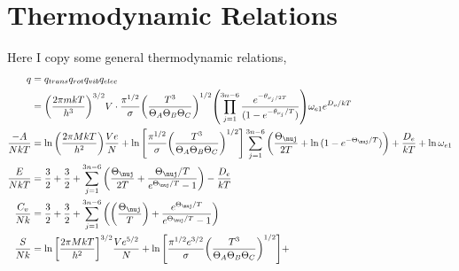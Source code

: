\section{Thermodynamic Relations}%
\label{sec:polytr}
Here I copy some general thermodynamic relations,
\begin{align*}
	q &= q_{trans} q_{rot} q_{vib} q_{elec}\\
	  &= {\left(\frac{2\pi mkT}{h^3}\right)}^{3/2}V \cdot
		 \frac{\pi^{1/2}}{\sigma}
		 {\left(\frac{T^3}{\Theta_A \Theta_B \Theta_{C}}\right)}^{1/2}
		 {\left(\prod_{j=1}^{3n-6}{\frac{e^{-\theta_{\nu_{j}/2T}}}{(1 -
		 e^{-\theta_{\nu_{j}}/T})}}\right)}
		 \omega_{e1} e^{D_o /kT}\\
	\frac{-A}{NkT} &= \ln{\left(\frac{2\pi MkT}{h^2}\right)}
		 \frac{Ve}{N} + \ln{\left[\frac{\pi^{1/2}}{\sigma}
		 {\left(\frac{T^3}{\Theta_A \Theta_B \Theta_{C}}\right)}^{1/2}
		 \right]}
		 \sum_{j=1}^{3n-6}{\left(\frac{\Theta_{\nuj}}{2T} +
		 \ln{(1 - e^{-\Theta_{\nuj}/T})}\right)} +
		 \frac{D_e}{kT} + \ln{\omega_{e1}}\\
	\frac{E}{NkT} &= \frac{3}{2} + \frac{3}{2} +
		\sum_{j=1}^{3n-6}{\left(\frac{\Theta_{\nuj}}{2T} +
		\frac{\Theta_{\nuj}/T}{e^{\Theta_{\nuj}/T} - 1}\right)}-
		\frac{D_e}{kT}\\
	\frac{C_v}{Nk} &= \frac{3}{2} + \frac{3}{2} + 
		\sum_{j=1}^{3n-6}{\left({\left(\frac{\Theta_{\nuj}}{T}\right)} +
		\frac{e^{\Theta_{\nuj}/T}}{e^{\Theta_{\nuj}/T} - 1}\right)}\\
	\frac{S}{Nk} &= \ln{\left[\frac{2\pi MkT}{h^{2}}\right]}^{3/2}
	\frac{Ve^{5/2}}{N} + \ln{\left[\frac{\pi^{1/2} e^{3/2}}{\sigma}
	{\left(\frac{T^3}{\Theta_A \Theta_B \Theta_{C}}\right)}^{1/2}\right]}
	+
\end{align*}
